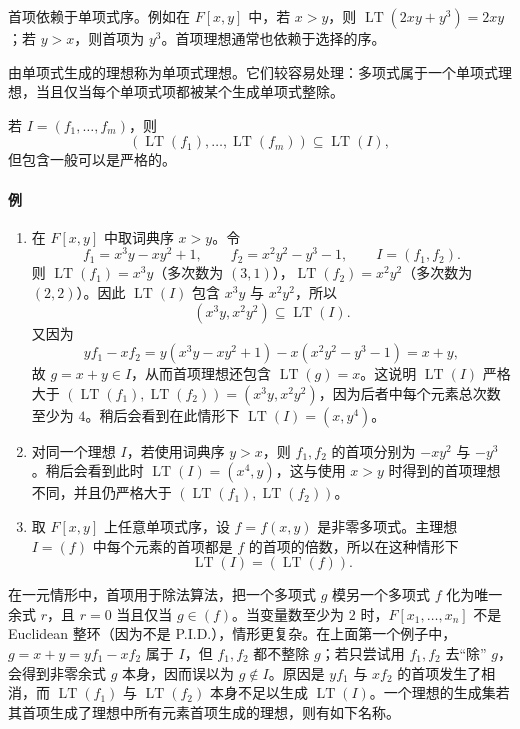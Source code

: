 首项依赖于单项式序。例如在 $F[x,y]$ 中，若 $x>y$，则 $\operatorname{LT}(2xy+y^3)=2xy$；若 $y>x$，则首项为 $y^3$。首项理想通常也依赖于选择的序。

由单项式生成的理想称为单项式理想。它们较容易处理：多项式属于一个单项式理想，当且仅当每个单项式项都被某个生成单项式整除。

若 $I=(f_1,\ldots,f_m)$，则
\[
(\operatorname{LT}(f_1),\ldots,\operatorname{LT}(f_m))\subseteq \operatorname{LT}(I),
\]
但包含一般可以是严格的。

\paragraph{例}
\begin{enumerate}[label=(\arabic*)]
	\item 在 $F[x,y]$ 中取词典序 $x>y$。令
\[
f_1=x^3y-xy^2+1,
\qquad f_2=x^2y^2-y^3-1,
\qquad I=(f_1,f_2).
\]
则 $\operatorname{LT}(f_1)=x^3y$（多次数为 $(3,1)$），$\operatorname{LT}(f_2)=x^2y^2$（多次数为 $(2,2)$）。因此 $\operatorname{LT}(I)$ 包含 $x^3y$ 与 $x^2y^2$，所以
\[
(x^3y,x^2y^2)\subseteq\operatorname{LT}(I).
\]
又因为
\[
yf_1-xf_2=y(x^3y-xy^2+1)-x(x^2y^2-y^3-1)=x+y,
\]
故 $g=x+y\in I$，从而首项理想还包含 $\operatorname{LT}(g)=x$。这说明 $\operatorname{LT}(I)$ 严格大于 $(\operatorname{LT}(f_1),\operatorname{LT}(f_2))=(x^3y,x^2y^2)$，因为后者中每个元素总次数至少为 $4$。稍后会看到在此情形下 $\operatorname{LT}(I)=(x,y^4)$。
	\item 对同一个理想 $I$，若使用词典序 $y>x$，则 $f_1,f_2$ 的首项分别为 $-xy^2$ 与 $-y^3$。稍后会看到此时 $\operatorname{LT}(I)=(x^4,y)$，这与使用 $x>y$ 时得到的首项理想不同，并且仍严格大于 $(\operatorname{LT}(f_1),\operatorname{LT}(f_2))$。
	\item 取 $F[x,y]$ 上任意单项式序，设 $f=f(x,y)$ 是非零多项式。主理想 $I=(f)$ 中每个元素的首项都是 $f$ 的首项的倍数，所以在这种情形下
\[
\operatorname{LT}(I)=(\operatorname{LT}(f)).
\]
\end{enumerate}

在一元情形中，首项用于除法算法，把一个多项式 $g$ 模另一个多项式 $f$ 化为唯一余式 $r$，且 $r=0$ 当且仅当 $g\in(f)$。当变量数至少为 $2$ 时，$F[x_1,\ldots,x_n]$ 不是 Euclidean 整环（因为不是 P.I.D.），情形更复杂。在上面第一个例子中，$g=x+y=yf_1-xf_2$ 属于 $I$，但 $f_1,f_2$ 都不整除 $g$；若只尝试用 $f_1,f_2$ 去“除” $g$，会得到非零余式 $g$ 本身，因而误以为 $g\notin I$。原因是 $yf_1$ 与 $xf_2$ 的首项发生了相消，而 $\operatorname{LT}(f_1)$ 与 $\operatorname{LT}(f_2)$ 本身不足以生成 $\operatorname{LT}(I)$。一个理想的生成集若其首项生成了理想中所有元素首项生成的理想，则有如下名称。

